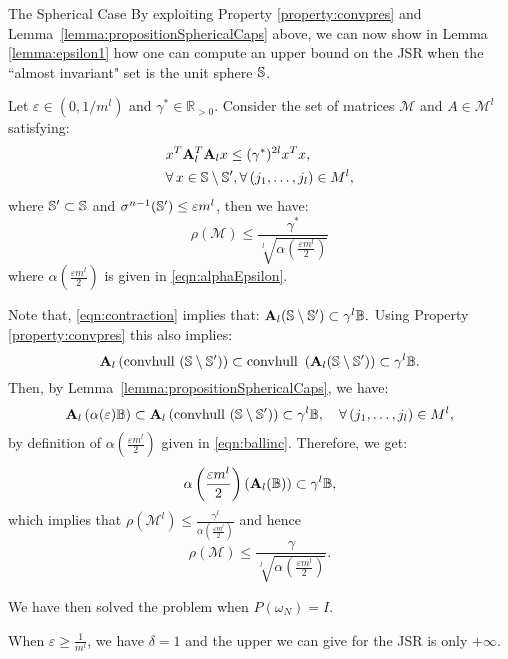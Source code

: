 \begin{subsection}{The Spherical Case}
By exploiting Property \ref{property:convpres} and Lemma~\ref{lemma:propositionSphericalCaps} above, we can now show in Lemma \ref{lemma:epsilon1} how one can compute an upper bound on the JSR when the ``almost invariant" set is the unit sphere $\mathbb{S}$.

\begin{prop}\label{lemma:epsilon1}
Let $\varepsilon \in (0, 1/m^l)$ and $\gamma^{*} \in \mathbb{R}_{> 0}$. Consider the set of matrices $\mathcal{M}$ and $A \in \mathcal{M}^l$ satisfying:
\begin{equation}\label{eqn:contraction}
\begin{aligned}
&x^T \mathbf{A}_l^T \mathbf{A}_l x \leq (\gamma^{*})^{2l} x^Tx, \\
& \forall\, x \in \mathbb{S} \setminus \mathbb{S}', \forall\,(j_1, \dots, j_l) \in M^l,
\end{aligned}
\end{equation}
where $\mathbb{S}' \subset \mathbb{S}$ and $\sigma^{n-1}(\mathbb{S}') \leq \varepsilon m^l$, then we have:
\begin{equation*}
\rho(\mathcal{M}) \leq \frac{\gamma^{*}}{\sqrt[l]{\alpha(\frac{\varepsilon m^l}{2})}}
\end{equation*}
where $\alpha(\frac{\varepsilon m^l}{2})$ is given in \eqref{eqn:alphaEpsilon}.
\end{prop}


\begin{pf}
Note that, \eqref{eqn:contraction} implies that:
$\mathbf{A}_l (\mathbb{S} \setminus \mathbb{S}') \subset \gamma^l \mathbb{B}.$
Using Property \ref{property:convpres} this also implies:
$$\mathbf{A}_l \left( \mbox{convhull }(\mathbb{S} \setminus \mathbb{S}') \right) \subset \mbox{convhull } \left( \mathbf{A}_l(\mathbb{S} \setminus \mathbb{S}') \right) \subset \gamma^l \mathbb{B} .$$
Then, by Lemma~\ref{lemma:propositionSphericalCaps}, we have:
$$\mathbf{A}_l \left( \alpha(\varepsilon) \mathbb{B} \right) \subset \mathbf{A}_l \left( \mbox{convhull } (\mathbb{S} \setminus \mathbb{S}') \right) \subset \gamma^l\mathbb{B}, \quad  \forall\, (j_1, \dots, j_l) \in M^l,$$
by definition of $\alpha(\frac{\varepsilon m^l}{2})$ given in \eqref{eqn:ballinc}. Therefore, we get:
$$\alpha \left( \frac{\varepsilon m^l}{2} \right) \left( \mathbf{A}_l (\mathbb{B}) \right) \subset \gamma^l\mathbb{B},$$
which implies that $\rho(\mathcal{M}^l) \leq \frac{\gamma^l}{\alpha(\frac{\varepsilon m^l}{2})}$ and hence $$\rho(\mathcal{M}) \leq \frac{\gamma}{\sqrt[l]{\alpha(\frac{\varepsilon m^l}{2})}}.$$
\end{pf}

We have then solved the problem when $P(\omega_N) = I$.

\begin{rem}
When $\varepsilon \geq \frac{1}{m^l}$, we have $\delta = 1$  and the upper we can give for the JSR is only $+ \infty$.
\end{rem}

\end{subsection}


